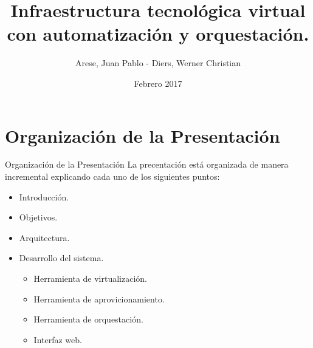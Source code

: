 \usepackage[english]{babel}
\usepackage[utf8x]{inputenc}

\title[Your Short Title]{Infraestructura tecnológica virtual con automatización y orquestación.}
\author{Arese, Juan Pablo - Diers, Werner Christian}
\date{Febrero 2017}




\begin{frame}
  \titlepage
\end{frame}


\section{Organización de la Presentación}

\begin{frame}{Organización de la Presentación}
    \vspace{-1.5cm}
    La precentación está organizada de manera incremental explicando cada uno de los siguientes puntos:\\
    \begin{itemize}
        \item Introducción.
        \item Objetivos.
        \item Arquitectura.
        \item Desarrollo del sistema.
        \begin{itemize}
            \item Herramienta de virtualización.
            \item Herramienta de aprovicionamiento.
            \item Herramienta de orquestación.
            \item Interfaz web.
        \end{itemize}
    \end{itemize}

\end{frame}



